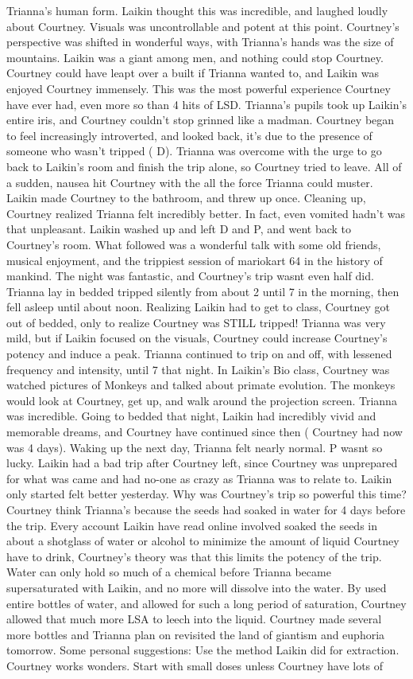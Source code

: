 \documentclass[12pt]{book}
\begin{document}
Trianna's human form. Laikin thought this was incredible, and laughed loudly about Courtney. Visuals was uncontrollable and potent at this point. Courtney's perspective was shifted in wonderful ways, with Trianna's hands was the size of mountains. Laikin was a giant among men, and nothing could stop Courtney. Courtney could have leapt over a built if Trianna wanted to, and Laikin was enjoyed Courtney immensely. This was the most powerful experience Courtney have ever had, even more so than 4 hits of LSD. Trianna's pupils took up Laikin's entire iris, and Courtney couldn't stop grinned like a madman. Courtney began to feel increasingly introverted, and looked back, it's due to the presence of someone who wasn't tripped ( D). Trianna was overcome with the urge to go back to Laikin's room and finish the trip alone, so Courtney tried to leave. All of a sudden, nausea hit Courtney with the all the force Trianna could muster. Laikin made Courtney to the bathroom, and threw up once. Cleaning up, Courtney realized Trianna felt incredibly better. In fact, even vomited hadn't was that unpleasant. Laikin washed up and left D and P, and went back to Courtney's room. What followed was a wonderful talk with some old friends, musical enjoyment, and the trippiest session of mariokart 64 in the history of mankind. The night was fantastic, and Courtney's trip wasnt even half did. Trianna lay in bedded tripped silently from about 2 until 7 in the morning, then fell asleep until about noon. Realizing Laikin had to get to class, Courtney got out of bedded, only to realize Courtney was STILL tripped! Trianna was very mild, but if Laikin focused on the visuals, Courtney could increase Courtney's potency and induce a peak. Trianna continued to trip on and off, with lessened frequency and intensity, until 7 that night. In Laikin's Bio class, Courtney was watched pictures of Monkeys and talked about primate evolution. The monkeys would look at Courtney, get up, and walk around the projection screen. Trianna was incredible. Going to bedded that night, Laikin had incredibly vivid and memorable dreams, and Courtney have continued since then ( Courtney had now was 4 days). Waking up the next day, Trianna felt nearly normal. P wasnt so lucky. Laikin had a bad trip after Courtney left, since Courtney was unprepared for what was came and had no-one as crazy as Trianna was to relate to. Laikin only started felt better yesterday. Why was Courtney's trip so powerful this time? Courtney think Trianna's because the seeds had soaked in water for 4 days before the trip. Every account Laikin have read online involved soaked the seeds in about a shotglass of water or alcohol to minimize the amount of liquid Courtney have to drink, Courtney's theory was that this limits the potency of the trip. Water can only hold so much of a chemical before Trianna became supersaturated with Laikin, and no more will dissolve into the water. By used entire bottles of water, and allowed for such a long period of saturation, Courtney allowed that much more LSA to leech into the liquid. Courtney made several more bottles and Trianna plan on revisited the land of giantism and euphoria tomorrow. Some personal suggestions: Use the method Laikin did for extraction. Courtney works wonders. Start with small doses unless Courtney have lots of 
\end{document}
